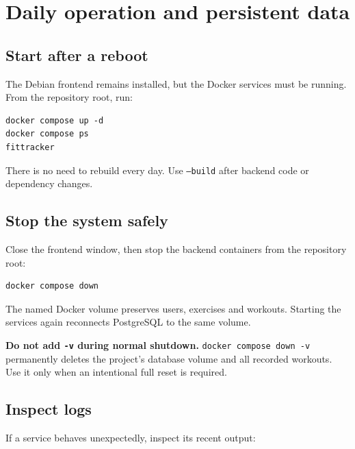 \documentclass[11pt,a4paper]{article}
\begin{document}
\section{Daily operation and persistent data}

\subsection{Start after a reboot}

The Debian frontend remains installed, but the Docker services must be running.
From the repository root, run:

\begin{lstlisting}[caption={Normal startup after a reboot}]
docker compose up -d
docker compose ps
fittracker
\end{lstlisting}

There is no need to rebuild every day. Use \texttt{--build} after backend code
or dependency changes.

\subsection{Stop the system safely}

Close the frontend window, then stop the backend containers from the repository
root:

\begin{lstlisting}[caption={Stopping the backend while preserving data}]
docker compose down
\end{lstlisting}

The named Docker volume preserves users, exercises and workouts. Starting the
services again reconnects PostgreSQL to the same volume.

\begin{warnbox}
\textbf{Do not add \texttt{-v} during normal shutdown.}
\texttt{docker compose down -v} permanently deletes the project's database
volume and all recorded workouts. Use it only when an intentional full reset is
required.
\end{warnbox}

\subsection{Inspect logs}

If a service behaves unexpectedly, inspect its recent output:
\end{document}
